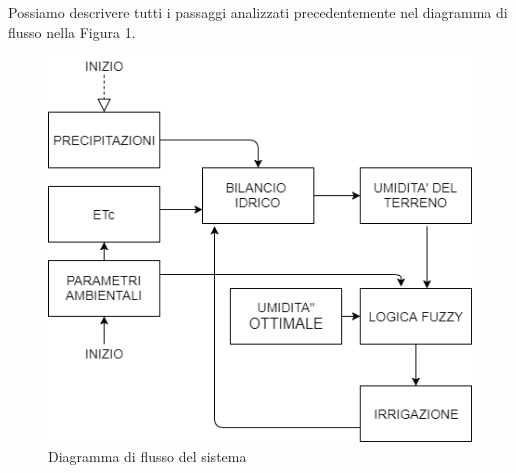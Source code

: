 \documentclass[conference,10pt]{IEEEtran}
\begin{document}
Possiamo descrivere tutti i passaggi analizzati precedentemente nel diagramma di flusso nella Figura 1.\vspace*{0.1 cm}
\begin{figure}[ht]
	\centering
	\includegraphics[width=0.8\linewidth]{images/flusso.png}
	\caption{Diagramma di flusso del sistema}
	\label{fig:flusso}
\end{figure}
\end{document}
